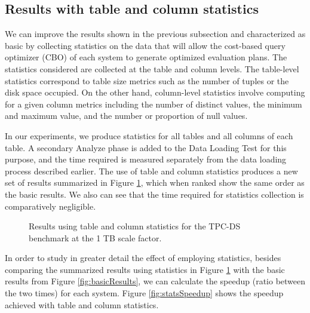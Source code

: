 \subsection{Results with table and column statistics}\label{statsResults}

We can improve the results shown in the previous subsection and characterized as basic by collecting statistics on the data that will allow the cost-based query optimizer (CBO) of each system to generate optimized evaluation plans. The statistics considered are collected at the table and column levels. The table-level statistics correspond to table size metrics such as the number of tuples or the disk space occupied. On the other hand, column-level statistics involve computing for a given column metrics including the number of distinct values, the minimum and maximum value, and the number or proportion of null values.

In our experiments, we produce statistics for all tables and all columns of each table. A secondary Analyze phase is added to the Data Loading Test for this purpose, and the time required is measured separately from the data loading process described earlier. The use of table and column statistics produces a new set of results summarized in Figure \ref{fig:statsResults}, which when ranked show the same order as the basic results. We also can see that the time required for statistics collection is comparatively negligible. 

\begin{figure}
   \begin{center}
   \end{center}
   \caption{Results using table and column statistics for the TPC-DS benchmark at the 1 TB scale factor.}
   \label{fig:statsResults}
\end{figure}

In order to study in greater detail the effect of employing statistics, besides comparing the summarized results using statistics in Figure \ref{fig:statsResults} with the basic results from Figure \ref{fig:basicResults}, we can calculate the speedup (ratio between the two times) for each system. Figure \ref{fig:statsSpeedup} shows the speedup achieved with table and column statistics.

